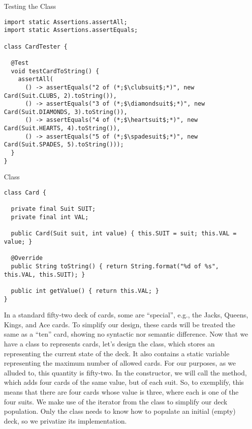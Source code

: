 \begin{cl}{Testing the  Class}
\begin{lstlisting}[language=MyJava]
import static Assertions.assertAll;
import static Assertions.assertEquals;

class CardTester {

  @Test
  void testCardToString() {
    assertAll(
      () -> assertEquals("2 of (*;$\clubsuit$;*)", new Card(Suit.CLUBS, 2).toString()),
      () -> assertEquals("3 of (*;$\diamondsuit$;*)", new Card(Suit.DIAMONDS, 3).toString()),
      () -> assertEquals("4 of (*;$\heartsuit$;*)", new Card(Suit.HEARTS, 4).toString()),
      () -> assertEquals("5 of (*;$\spadesuit$;*)", new Card(Suit.SPADES, 5).toString()));
  }
}
\end{lstlisting}
\end{cl}

\begin{cl}{ Class}
\begin{lstlisting}[language=MyJava]
class Card {

  private final Suit SUIT;
  private final int VAL;

  public Card(Suit suit, int value) { this.SUIT = suit; this.VAL = value; }
  
  @Override
  public String toString() { return String.format("%d of %s", this.VAL, this.SUIT); }

  public int getValue() { return this.VAL; } 
}
\end{lstlisting}
\end{cl}

In a standard fifty-two deck of cards, some are ``special'', e.g., the Jacks, Queens, Kings, and Ace cards. To simplify our design, these cards will be treated the same as a ``ten'' card, showing no syntactic nor semantic difference. Now that we have a class to represents cards, let's design the  class, which stores an  representing the current state of the deck. It also contains a static variable representing the maximum number of allowed cards. For our purposes, as we alluded to, this quantity is fifty-two. In the  constructor, we will call the  method, which adds four cards of the same value, but of each suit. So, to exemplify, this means that there are four cards whose value is three, where each is one of the four suits. We make use of the iterator from the  class to simplify our deck population. Only the  class needs to know how to populate an initial (empty) deck, so we privatize its implementation.

